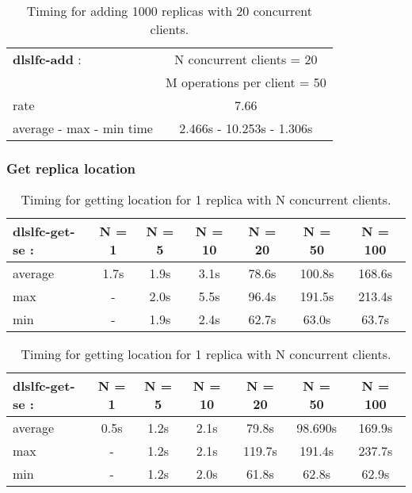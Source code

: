 \documentclass[pdftex]{cmspaper}
\begin{document}
\begin{table}[!htbp]
\begin{center}
 \begin{tabular}{|l|c|}         \hline
   {\bf dlslfc-add} : & N concurrent clients = 20  \\ 
 & M operations per client = 50\\ \hline
    rate             & 7.66 \\ \hline
    average - max - min time  & 2.466s - 10.253s - 1.306s \\ \hline
\end{tabular}
\caption {Timing for adding 1000 replicas with 20 concurrent clients.}\label{dlslfc-add}
\end{center}
\end{table}

\subsubsection{Get replica location}

\begin{table}[!htbp]
\begin{center}
 \begin{tabular}{|l|c|c|c|c|c|c|}         \hline
 {\bf dlslfc-get-se} : & N = 1  & N  = 5  & N = 10 & N = 20 & N = 50 & N = 100 \\ \hline
  average & 1.7s & 1.9s & 3.1s &  78.6s &  100.8s  & 168.6s \\ \hline
  max     & -    & 2.0s & 5.5s &  96.4s & 191.5s &  213.4s \\ \hline
  min     &  -   & 1.9s & 2.4s  & 62.7s & 63.0s  & 63.7s \\ \hline
\end{tabular}
\caption {Timing for getting location for 1 replica with N concurrent clients.}\label{dlslfc-add}
\end{center}
\end{table}

\begin{table}[!htbp]
\begin{center}
 \begin{tabular}{|l|c|c|c|c|c|c|}         \hline
 {\bf dlslfc-get-se} : & N = 1  & N  = 5  & N = 10 & N = 20 & N = 50 & N = 100 \\ \hline
  average           & 0.5s   & 1.2s   & 2.1s  &  79.8s  & 98.690s  & 169.9s \\ \hline
  max               &  -     & 1.2s   & 2.1s  &  119.7s  & 191.4s  & 237.7s \\ \hline
  min               &  -     & 1.2s   & 2.0s  &  61.8s  & 62.8s   & 62.9s \\ \hline
\end{tabular}
\caption {Timing for getting location for 1 replica  with N concurrent clients.}\label{dlslfc-add}
\end{center}
\end{table}
\end{document}
